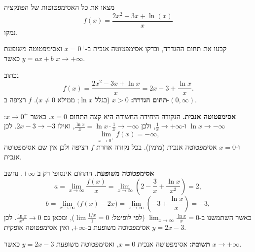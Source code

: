 
\begin{question}
מצאו את כל האסימפטוטות של הפונקציה
\[ f(x) = \frac{2x^2 - 3x + \ln(x)}{x} \]
נמקו.
\end{question}

\begin{hint}
קבעו את תחום ההגדרה, ובדקו אסימפטוטה אנכית ב-$x = 0^+$ ואסימפטוטה משופעת $y = ax + b$ כאשר $x \to +\infty$.
\end{hint}

\begin{solution}
נכתוב
\[ f(x) = \frac{2x^2 - 3x + \ln x}{x} = 2x - 3 + \frac{\ln x}{x}. \]
\textbf{תחום הגדרה:} $x > 0$ (בגלל $\ln x$; ממילא $x \ne 0$). $f$ רציפה ב-$(0, \infty)$.

\textbf{אסימפטוטה אנכית.} הנקודה היחידה החשודה היא קצה התחום $x = 0$. כאשר $x \to 0^+$: $\ln x \to -\infty$ ו-$\frac1x \to +\infty$, ולכן $\frac{\ln x}{x} = \ln x\cdot\frac1x \to -\infty$, ואילו $2x - 3 \to -3$. לכן
\[ \lim_{x\to0^+} f(x) = -\infty, \]
ו-$x = 0$ אסימפטוטה אנכית (מימין). בכל נקודה אחרת $f$ רציפה ולכן אין שם אסימפטוטה אנכית.

\textbf{אסימפטוטה משופעת.} התחום אינסופי רק ב-$+\infty$. נחשב
\[ a = \lim_{x\to\infty}\frac{f(x)}{x} = \lim_{x\to\infty}\left( 2 - \frac3x + \frac{\ln x}{x^2} \right) = 2, \]
\[ b = \lim_{x\to\infty}\bigl(f(x) - 2x\bigr) = \lim_{x\to\infty}\left( -3 + \frac{\ln x}{x} \right) = -3, \]
כאשר השתמשנו ב-$\lim_{x\to\infty}\frac{\ln x}{x} = 0$ (לפי לופיטל: $\lim \frac{1/x}{1} = 0$), ומכאן גם $\frac{\ln x}{x^2} \to 0$. לכן $y = 2x - 3$ אסימפטוטה משופעת ב-$+\infty$, ואין אסימפטוטה אופקית.

\textbf{תשובה:} אסימפטוטה אנכית $x = 0$, ואסימפטוטה משופעת $y = 2x - 3$ כאשר $x \to +\infty$.
\end{solution}
